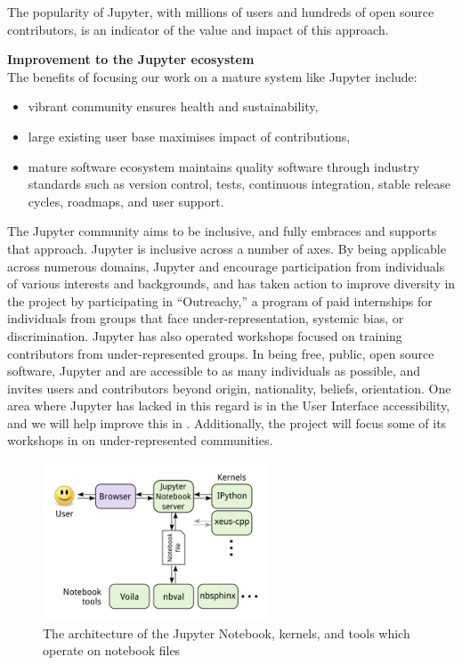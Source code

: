 The popularity of Jupyter, with millions of users and hundreds of open
source contributors, is an indicator of the value and impact of this approach.

\medskip
\noindent\textbf{Improvement to the Jupyter ecosystem}\\
The benefits of focusing our work on a mature system like Jupyter include:

\begin{itemize}
\item vibrant community ensures health and sustainability,
\item large existing user base maximises impact of contributions,
\item mature software ecosystem maintains quality software through
  industry standards such as version control, tests, continuous
  integration, stable release cycles, roadmaps, and user support.
\end{itemize}

The Jupyter community aims to be inclusive, and \TheProject fully
embraces and supports that approach.  Jupyter is inclusive across a number of axes.
By being applicable across numerous domains, Jupyter and \TheProject
encourage participation from individuals of various interests and
backgrounds, and has taken action to improve diversity in the project
by participating in ``Outreachy,'' a program of paid internships for
individuals from groups that face under-representation, systemic bias,
or discrimination.  Jupyter has also operated workshops focused on
training contributors from under-represented groups.  In being free,
public, open source software, Jupyter and \TheProject are accessible
to as many individuals as possible, and invites users and contributors
beyond origin, nationality, beliefs, orientation.  One area where
Jupyter has lacked in this regard is in the User Interface
accessibility, and we will help improve this in
.  Additionally, the project will
focus some of its workshops in  on
under-represented communities.


\begin{figure}[ht!]\centering
  \includegraphics[width=0.6\textwidth]{images/notebook_components.png}
  \caption{The architecture of the Jupyter Notebook, kernels, and tools
        which operate on notebook files}
  \label{fig:notebook-architecture}
\end{figure}

